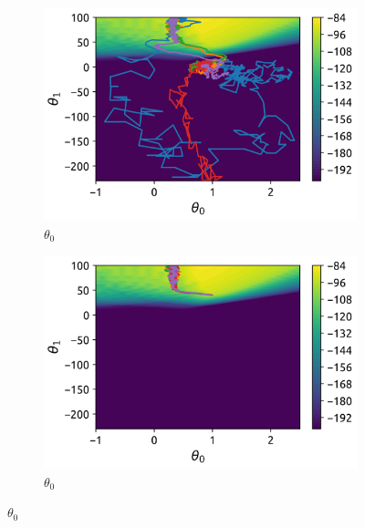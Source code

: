 \documentclass{article}
\newcounter{n}
\begin{document}
\begin{figure}
\centering
\begin{subfigure}[b]{0.3\textwidth}
    \centering
    \includegraphics[width=\textwidth]{img-1.png}
    \caption{$\theta _0$}
    \label{fig1}
\end{subfigure}
\begin{subfigure}[b]{0.3\textwidth}
    \centering
    \includegraphics[width=\textwidth]{img-3.png}
    \caption{$\theta _0$}
    \label{fig2}
\end{subfigure}
\end{figure}
\end{document}
